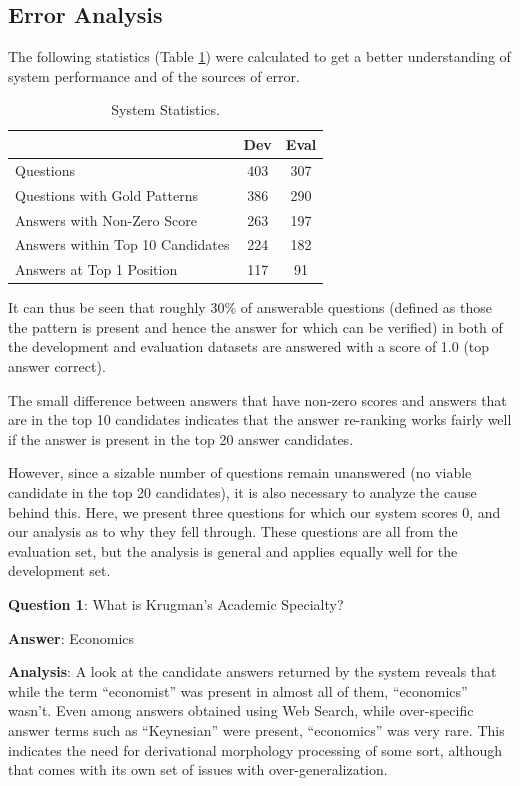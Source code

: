 \documentclass[11pt]{article}
\begin{document}
\subsection{Error Analysis}
The following statistics (Table \ref{stats}) were calculated to get a better understanding of system performance and of the sources of error. 

\begin{table}[h]
\begin{center}
\begin{tabular}{ |l |c |c| }
\hline
& Dev & Eval\\
\hline
Questions & 403 & 307\\
Questions with Gold Patterns & 386 & 290\\
Answers with Non-Zero Score & 263 & 197\\
Answers within Top 10 Candidates & 224 & 182\\
Answers at Top 1 Position & 117 & 91\\
\hline
\end{tabular}
\end{center}
\caption{\label{stats} System Statistics. 
}
\end{table}
It can thus be seen that roughly 30\% of answerable questions (defined as those the pattern is present and hence the answer for which can be verified) in both of the development and evaluation datasets are answered with a score of 1.0 (top answer correct).

The small difference between answers that have non-zero scores and answers that are in the top 10 candidates indicates that the answer re-ranking works fairly well if the answer is present in the top 20 answer candidates. 

However, since a sizable number of questions remain unanswered (no viable candidate in the top 20 candidates), it is also necessary to analyze the cause behind this.  Here, we present three questions for which our system scores 0, and our analysis as to why they fell through. These questions are all from the evaluation set, but the analysis is general and applies equally well for the development set.


\noindent \textbf{Question 1}: What is Krugman's Academic Specialty? 

\noindent \textbf{Answer}: Economics

\noindent \textbf{Analysis}: A look at the candidate answers returned by the system reveals that while the term ``economist'' was present in almost all of them, ``economics'' wasn't. Even among answers obtained using Web Search, while over-specific answer terms such as ``Keynesian'' were present, ``economics'' was very rare. This indicates the need for derivational morphology processing of some sort, although that comes with its own set of issues with over-generalization.
\end{document}
